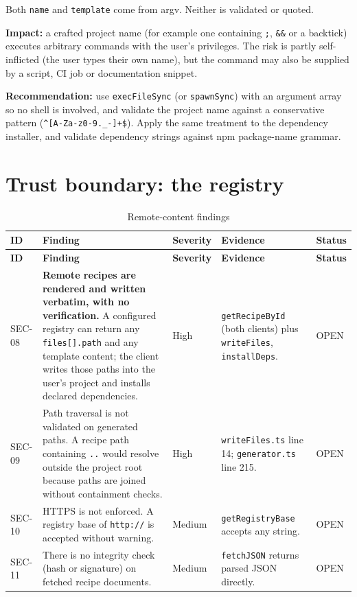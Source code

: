 Both \texttt{name} and \texttt{template} come from argv. Neither is validated or
quoted.

\textbf{Impact:} a crafted project name (for example one containing
\texttt{;}, \texttt{\&\&} or a backtick) executes arbitrary commands with the user's
privileges. The risk is partly self-inflicted (the user types their own name), but
the command may also be supplied by a script, CI job or documentation snippet.

\textbf{Recommendation:} use \texttt{execFileSync} (or
\texttt{spawnSync}) with an argument array so no shell is involved, and validate
the project name against a conservative pattern
(\texttt{\^{}[A-Za-z0-9.\_-]+\$}). Apply the same treatment to the dependency
installer, and validate dependency strings against npm package-name grammar.

\section{Trust boundary: the registry}

\begin{longtable}{@{}L{1.3cm}L{3.6cm}L{1.9cm}L{5.8cm}L{1.6cm}@{}}
\caption{Remote-content findings}\\
\toprule
\textbf{ID} & \textbf{Finding} & \textbf{Severity} & \textbf{Evidence} & \textbf{Status} \\
\midrule
\endfirsthead
\toprule
\textbf{ID} & \textbf{Finding} & \textbf{Severity} & \textbf{Evidence} & \textbf{Status} \\
\midrule
\endhead
SEC-08 & \textbf{Remote recipes are rendered and written verbatim, with no
verification.} A configured registry can return any \texttt{files[].path} and any
template content; the client writes those paths into the user's project and
installs declared dependencies. & High &
\texttt{getRecipeById} (both clients) plus \texttt{writeFiles},
\texttt{installDeps}. & OPEN \\
SEC-09 & Path traversal is not validated on generated paths. A recipe path
containing \texttt{..} would resolve outside the project root because paths are
joined without containment checks. & High &
\texttt{writeFiles.ts} line 14; \texttt{generator.ts} line 215. & OPEN \\
SEC-10 & HTTPS is not enforced. A registry base of \texttt{http://} is accepted
without warning. & Medium & \texttt{getRegistryBase} accepts any string. & OPEN \\
SEC-11 & There is no integrity check (hash or signature) on fetched recipe
documents. & Medium & \texttt{fetchJSON} returns parsed JSON directly. & OPEN \\
\bottomrule
\end{longtable}

